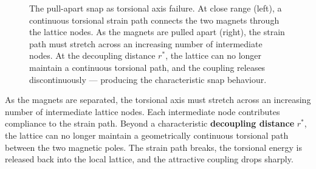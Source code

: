 \documentclass[11pt, letterpaper, openany]{book}
\begin{document}
\begin{figure}[H]
\centering
{}
\caption{The pull-apart snap as torsional axis failure. At close range
(left), a continuous torsional strain path connects the two magnets
through the lattice nodes. As the magnets are pulled apart (right),
the strain path must stretch across an increasing number of intermediate
nodes. At the decoupling distance $r^*$, the lattice can no longer
maintain a continuous torsional path, and the coupling releases
discontinuously — producing the characteristic snap behaviour.}
\end{figure}

As the magnets are separated, the torsional axis must stretch across an
increasing number of intermediate lattice nodes. Each intermediate node
contributes compliance to the strain path. Beyond a characteristic
\textbf{decoupling distance} $r^*$, the lattice can no longer maintain
a geometrically continuous torsional path between the two magnetic poles.
The strain path breaks, the torsional energy is released back into the
local lattice, and the attractive coupling drops sharply.
\end{document}
